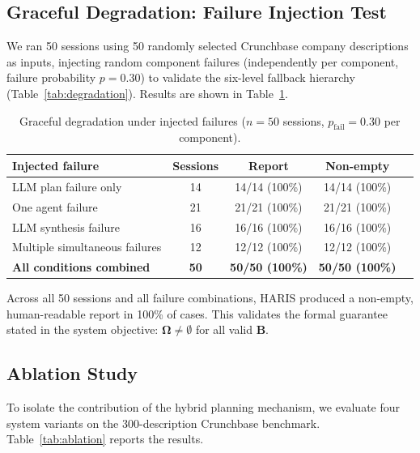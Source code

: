 \documentclass[preprint,12pt]{elsarticle}
\newcommand{\B}{\mathbf{B}}
\newcommand{\Om}{\boldsymbol{\Omega}}
\begin{document}
\subsection{Graceful Degradation: Failure Injection Test}
\label{sec:failinject}

We ran 50 sessions using 50 randomly selected Crunchbase company descriptions as
inputs, injecting random component failures (independently per component, failure
probability $p{=}0.30$) to validate the six-level fallback hierarchy
(Table~\ref{tab:degradation}). Results are shown in Table~\ref{tab:failinject}.

\begin{table}[t]
\centering
\caption{Graceful degradation under injected failures ($n{=}50$ sessions,
  $p_{\text{fail}}{=}0.30$ per component).}
\label{tab:failinject}
\begin{tabular}{lcccc}
\toprule
\textbf{Injected failure} & \textbf{Sessions} & \textbf{Report} & \textbf{Non-empty} \\
\midrule
LLM plan failure only          & 14 & 14/14 (100\%) & 14/14 (100\%) \\
One agent failure              & 21 & 21/21 (100\%) & 21/21 (100\%) \\
LLM synthesis failure          & 16 & 16/16 (100\%) & 16/16 (100\%) \\
Multiple simultaneous failures & 12 & 12/12 (100\%) & 12/12 (100\%) \\
\midrule
\textbf{All conditions combined} & \textbf{50} & \textbf{50/50 (100\%)} & \textbf{50/50 (100\%)} \\
\bottomrule
\end{tabular}
\end{table}

Across all 50 sessions and all failure combinations, HARIS produced a non-empty,
human-readable report in 100\% of cases. This validates the formal guarantee
stated in the system objective: $\Om \ne \emptyset$ for all valid $\B$.

\subsection{Ablation Study}
\label{sec:ablation}

To isolate the contribution of the hybrid planning mechanism, we evaluate four
system variants on the 300-description Crunchbase benchmark.
Table~\ref{tab:ablation} reports the results.
\end{document}
